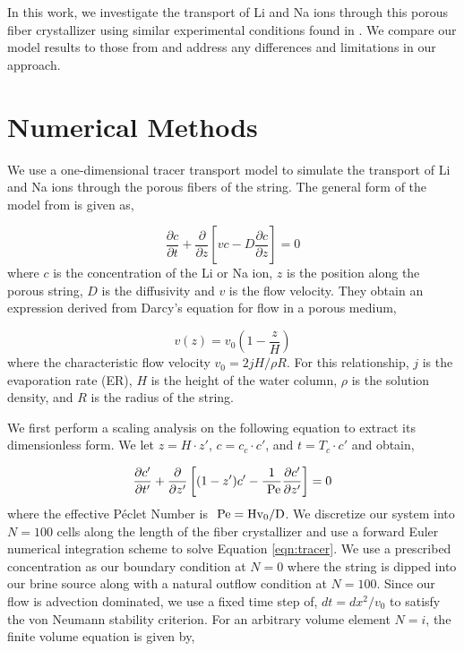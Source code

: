 \documentclass{article}
\begin{document}
In this work, we investigate the transport of Li and Na ions through this porous fiber crystallizer using similar experimental conditions found in \cite{Chen2023}. We compare our model results to those from \cite{Chen2023} and address any differences and limitations in our approach. 

\section*{Numerical Methods}

We use a one-dimensional tracer transport model to simulate the transport of Li and Na ions through the porous fibers of the string. The general form of the model from \cite{Chen2023} is given as,

\begin{equation}
\frac{\partial c}{\partial t} + \frac{\partial}{\partial z}\left[vc - D\frac{\partial c}{\partial z} \right] = 0
\end{equation}
where $c$ is the concentration of the Li or Na ion, $z$ is the position along the porous string, $D$ is the diffusivity and $v$ is the flow velocity. They obtain an expression derived from Darcy's equation for flow in a porous medium, 

\begin{equation}
    v(z) = v_0\left(1 - \frac{z}{H} \right)
\end{equation}
where the characteristic flow velocity $v_0 = 2jH/\rho R$. For this relationship, $j$ is the evaporation rate (ER), $H$ is the height of the water column, $\rho$ is the solution density, and $R$ is the radius of the string. 

We first perform a scaling analysis on the following equation to extract its dimensionless form. We let $z = H\cdot z'$, $c=c_c\cdot c'$, and $t=T_c\cdot c'$ and obtain,

\begin{equation}
\frac{\partial c'}{\partial t'} + \frac{\partial}{\partial z'}\left[(1-z')c' - \frac{1}{\rm~Pe}\frac{\partial c'}{\partial z'} \right] = 0
\label{eqn:tracer}
\end{equation}
where the effective P\'eclet Number is $\rm~Pe = Hv_0/D$. We discretize our system into $N=100$ cells along the length of the fiber crystallizer and use a forward Euler numerical integration scheme to solve Equation \ref{eqn:tracer}. We use a prescribed concentration as our boundary condition at $N=0$ where the string is dipped into our brine source along with a natural outflow condition at $N=100$. Since our flow is advection dominated, we use a fixed time step of, $dt = dx^2/v_0$ to satisfy the von Neumann stability criterion. For an arbitrary volume element $N=i$, the finite volume equation is given by, 
\end{document}
